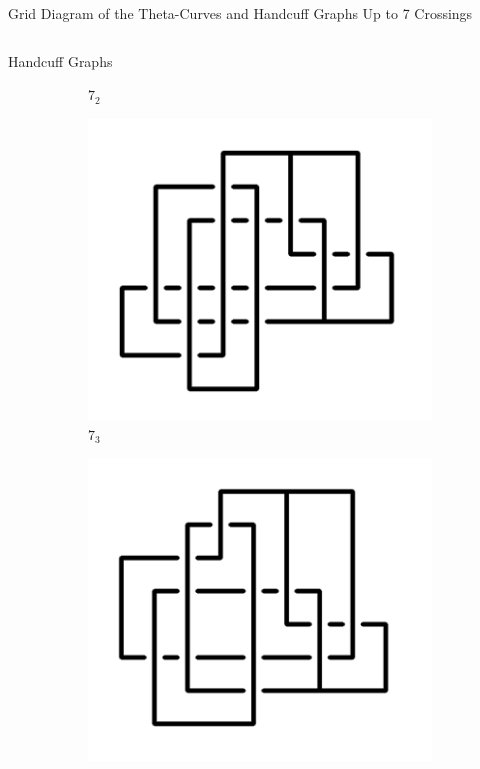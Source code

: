 \documentclass[final]{beamer}
\begin{document}
\begin{frame}[t]
\begin{alertblock}{Grid Diagram of the Theta-Curves and Handcuff Graphs Up to 7 Crossings}
\begin{columns}[t]
\begin{column}{0.5\textwidth}
\begin{alertblock}{Handcuff Graphs}
\begin{figure}
\begin{subfigure}{0.075\textwidth}
    \caption{$7_{2}$} 
    \end{subfigure}
    \begin{subfigure}{0.075\textwidth}
    \includegraphics[width=\columnwidth]{../Midterm_Poster/grid_diagram/handcuff_7_3.png}
    \caption{$7_{3}$} 
    \end{subfigure}
    \begin{subfigure}{0.075\textwidth}
    \includegraphics[width=\columnwidth]{../Midterm_Poster/grid_diagram/handcuff_7_4.png}

\end{subfigure}
\end{figure}
\end{alertblock}
\end{column}
\end{columns}
\end{alertblock}
\end{frame}
\end{document}
